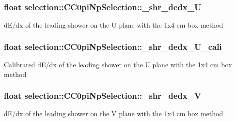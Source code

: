 \subsubsection[{\texorpdfstring{\+\_\+shr\+\_\+dedx\+\_\+U}{_shr_dedx_U}}]{\setlength{\rightskip}{0pt plus 5cm}float selection\+::\+C\+C0pi\+Np\+Selection\+::\+\_\+shr\+\_\+dedx\+\_\+U\hspace{0.3cm}{\ttfamily [private]}}\hypertarget{classselection_1_1CC0piNpSelection_ada2f72c2f814e7d06c24a50ff5ad4fcc}{}\label{classselection_1_1CC0piNpSelection_ada2f72c2f814e7d06c24a50ff5ad4fcc}
d\+E/dx of the leading shower on the U plane with the 1x4 cm box method 
\subsubsection[{\texorpdfstring{\+\_\+shr\+\_\+dedx\+\_\+\+U\+\_\+cali}{_shr_dedx_U_cali}}]{\setlength{\rightskip}{0pt plus 5cm}float selection\+::\+C\+C0pi\+Np\+Selection\+::\+\_\+shr\+\_\+dedx\+\_\+\+U\+\_\+cali\hspace{0.3cm}{\ttfamily [private]}}\hypertarget{classselection_1_1CC0piNpSelection_a7c90820db5398c179aef3186ab11e521}{}\label{classselection_1_1CC0piNpSelection_a7c90820db5398c179aef3186ab11e521}
Calibrated d\+E/dx of the leading shower on the U plane with the 1x4 cm box method 
\subsubsection[{\texorpdfstring{\+\_\+shr\+\_\+dedx\+\_\+V}{_shr_dedx_V}}]{\setlength{\rightskip}{0pt plus 5cm}float selection\+::\+C\+C0pi\+Np\+Selection\+::\+\_\+shr\+\_\+dedx\+\_\+V\hspace{0.3cm}{\ttfamily [private]}}\hypertarget{classselection_1_1CC0piNpSelection_a392211f6d023d92bf113c20098c5e7fe}{}\label{classselection_1_1CC0piNpSelection_a392211f6d023d92bf113c20098c5e7fe}
d\+E/dx of the leading shower on the V plane with the 1x4 cm box method 
